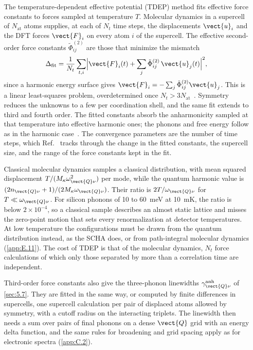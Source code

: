 The temperature-dependent effective potential (TDEP) method fits effective force constants to forces sampled at temperature $T$. Molecular dynamics in a supercell of $N_{\mathrm{at}}$ atoms supplies, at each of $N_t$ time steps, the displacements $\vect{u}_i$ and the DFT forces $\vect{F}_i$ on every atom $i$ of the supercell. The effective second-order force constants $\tilde\Phi^{(2)}_{ij}$ are those that minimize the mismatch
\begin{equation}
  \Delta_{\mathrm{fit}} = \frac{1}{N_t}\sum_{t,i}\Bigl|\vect{F}_{i}(t) + \sum_j\tilde\Phi^{(2)}_{ij}\,\vect{u}_j(t)\Bigr|^2 ,
  \label{eq:E.8-tdep}
\end{equation}
since a harmonic energy surface gives $\vect{F}_i = -\sum_j\tilde\Phi^{(2)}_{ij}\vect{u}_j$. This is a linear least-squares problem, overdetermined once $N_t > 3N_{\mathrm{at}}$~\cite[Eq.~(3), with the opposite sign convention for the force constants]{hellman2011lattice}. Symmetry reduces the unknowns to a few per coordination shell, and the same fit extends to third and fourth order. The fitted constants absorb the anharmonicity sampled at that temperature into effective harmonic ones; the phonons and free energy follow as in the harmonic case~\cite{hellman2013temperature}. The convergence parameters are the number of time steps, which Ref.~\cite[Fig.~1]{hellman2011lattice} tracks through the change in the fitted constants, the supercell size, and the range of the force constants kept in the fit.

Classical molecular dynamics samples a classical distribution, with mean squared displacement $T/(M_\kappa\omega_{\vect{Q}\nu}^2)$ per mode, while the quantum harmonic value is $(2n_{\vect{Q}\nu} + 1)/(2M_\kappa\omega_{\vect{Q}\nu})$. Their ratio is $2T/\omega_{\vect{Q}\nu}$ for $T \ll \omega_{\vect{Q}\nu}$. For silicon phonons of 10 to \SI{60}{meV} at \SI{10}{mK}, the ratio is below $2\times10^{-4}$, so a classical sample describes an almost static lattice and misses the zero-point motion that sets every renormalization at detector temperatures. At low temperature the configurations must be drawn from the quantum distribution instead, as the SCHA does, or from path-integral molecular dynamics (\cref{app:E.11}). The cost of TDEP is that of the molecular dynamics, $N_t$ force calculations of which only those separated by more than a correlation time are independent.

Third-order force constants also give the three-phonon linewidths $\gamma^{\mathrm{anh}}_{\vect{Q}\nu}$ of \cref{sec:5.7}. They are fitted in the same way, or computed by finite differences in supercells, one supercell calculation per pair of displaced atoms allowed by symmetry, with a cutoff radius on the interacting triplets. The linewidth then needs a sum over pairs of final phonons on a dense $\vect{Q}$ grid with an energy delta function, and the same rules for broadening and grid spacing apply as for electronic spectra (\cref{app:C.2}).

